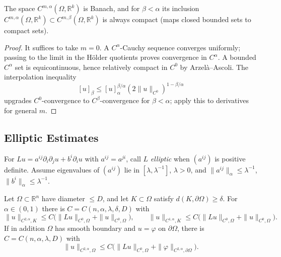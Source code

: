\begin{lemma}
  \label{lem:pet-ch11-holder-space-banach-compact-inclusion}
  The space $C^{m,\alpha}(\Omega,\mathbb{R}^k)$ is Banach, and for
  $\beta<\alpha$ its inclusion
  $C^{m,\alpha}(\Omega,\mathbb{R}^k)\subset C^{m,\beta}(\Omega,\mathbb{R}^k)$ is
  always compact (maps closed bounded sets to compact sets).
\end{lemma}
\begin{proof}
  \sketch
  It suffices to take \(m=0\). A \(C^\alpha\)-Cauchy sequence converges uniformly; passing to the limit in the Hölder quotients proves convergence in \(C^\alpha\). A bounded \(C^\alpha\) set is equicontinuous, hence relatively compact in \(C^0\) by Arzelà--Ascoli. The interpolation inequality
  \[
    [u]_\beta\le [u]_\alpha^{\beta/\alpha}(2\|u\|_{C^0})^{1-\beta/\alpha}
  \]
  upgrades \(C^0\)-convergence to \(C^\beta\)-convergence for \(\beta<\alpha\); apply this to derivatives for general \(m\).
\end{proof}


\subsection{Elliptic Estimates}

\begin{definition}
  \label{def:pet-ch11-elliptic-operator}
  For $Lu=a^{ij}\partial_i\partial_ju+b^i\partial_iu$ with $a^{ij}=a^{ji}$,
  call $L$ \emph{elliptic} when $(a^{ij})$ is positive definite. Assume
  eigenvalues of $(a^{ij})$ lie in $[\lambda,\lambda^{-1}]$, $\lambda>0$, and
  $\|a^{ij}\|_\alpha\le\lambda^{-1}$, $\|b^i\|_\alpha\le\lambda^{-1}$.
\end{definition}

\begin{theorem}
  \label{thm:pet-ch11-schauder-estimates}
  Let $\Omega\subset\mathbb{R}^n$ have diameter $\le D$, and let
  $K\subset\Omega$ satisfy $d(K,\partial\Omega)\ge\delta$. For
  $\alpha\in(0,1)$ there is
  $C=C(n,\alpha,\lambda,\delta,D)$ with
  \[
    \|u\|_{C^{2,\alpha},K}\le C\big(\|Lu\|_{C^0,\Omega}+\|u\|_{C^0,\Omega}\big),
    \qquad
    \|u\|_{C^{1,\alpha},K}\le C\big(\|Lu\|_{C^0,\Omega}+\|u\|_{C^0,\Omega}\big).
  \]
  If in addition $\Omega$ has smooth boundary and $u=\varphi$ on
  $\partial\Omega$, there is $C=C(n,\alpha,\lambda,D)$ with
  \[
    \|u\|_{C^{2,\alpha},\Omega}\le C\big(\|Lu\|_{C^0,\Omega}+\|\varphi\|_{C^{2,\alpha},\partial\Omega}\big).
  \]
\end{theorem}

